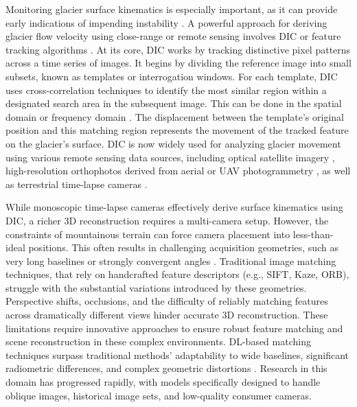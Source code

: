 Monitoring glacier surface kinematics is especially important, as it can provide early indications of impending instability \citep{Faillettaz2015}.
A powerful approach for deriving glacier flow velocity using close-range or remote sensing involves DIC or feature tracking algorithms \cite{ahn_box_2010, Giordan2016, Hadhri2019}.
At its core, DIC works by tracking distinctive pixel patterns across a time series of images.
It begins by dividing the reference image into small subsets, known as templates or interrogation windows. 
For each template, DIC uses cross-correlation techniques to identify the most similar region within a designated search area in the subsequent image.
This can be done in the spatial domain \citep{Scambos1992} or frequency domain \citep{rolstad1997}.
The displacement between the template’s original position and this matching region represents the movement of the tracked feature on the glacier's surface.
DIC is now widely used for analyzing glacier movement using various remote sensing data sources, including optical satellite imagery \citep{Scambos1992, Scherler2008, Heid2012_evaluation_xcorr}, high-resolution orthophotos derived from aerial or UAV photogrammetry \citep{immerzeel2014, Chudley2019, ioli2021mid}, as well as terrestrial time-lapse cameras \cite{Messerli2015, Giordan2016}. 

While monoscopic time-lapse cameras effectively derive surface kinematics using DIC, a richer 3D reconstruction requires a multi-camera setup. 
However, the constraints of mountainous terrain can force camera placement into less-than-ideal positions. 
This often results in challenging acquisition geometries, such as very long baselines or strongly convergent angles \citep{ioli2024deep}.
Traditional image matching techniques, that rely on handcrafted feature descriptors (e.g., SIFT, Kaze, ORB), struggle with the substantial variations introduced by these geometries.  Perspective shifts, occlusions, and the difficulty of reliably matching features across dramatically different views hinder accurate 3D reconstruction. 
These limitations require innovative approaches to ensure robust feature matching and scene reconstruction in these complex environments.
DL-based matching techniques surpass traditional methods' adaptability to wide baselines, significant radiometric differences, and complex geometric distortions \cite{Yao_2021}. 
Research in this domain has progressed rapidly, with models specifically designed to handle oblique images, historical image sets, and low-quality consumer cameras.

